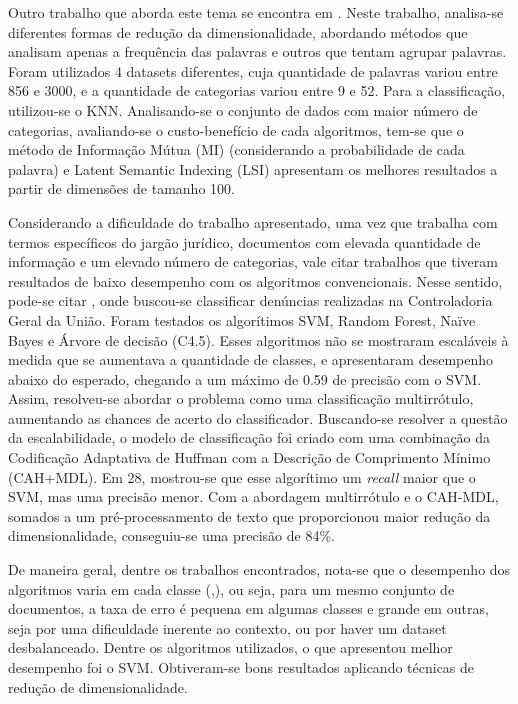 Outro trabalho que aborda este tema se encontra em \cite{ciarelli_agglomeration_2009}. Neste trabalho, analisa-se diferentes formas de redução da dimensionalidade, abordando métodos que analisam apenas a frequência das palavras e outros que tentam agrupar palavras. Foram utilizados 4 datasets diferentes, cuja quantidade de palavras variou entre 856 e 3000, e a quantidade de categorias variou entre 9 e 52. Para a classificação, utilizou-se o KNN. Analisando-se o conjunto de dados com maior número de categorias, avaliando-se o custo-benefício de cada algoritmos, tem-se que o método de Informação Mútua (MI) (considerando a probabilidade de cada palavra) e Latent Semantic Indexing (LSI) apresentam os melhores resultados a partir de dimensões de tamanho 100.

Considerando a dificuldade do trabalho apresentado, uma vez que trabalha com termos específicos do jargão jurídico, documentos com elevada quantidade de informação e um elevado número de categorias, vale citar trabalhos que tiveram resultados de baixo desempenho com os algoritmos convencionais. Nesse sentido, pode-se citar \cite{ladeirahuffman}, onde buscou-se classificar denúncias realizadas na Controladoria Geral da União. Foram testados os algorítimos SVM, Random Forest, Naïve Bayes e Árvore de decisão (C4.5). Esses algoritmos não se mostraram escaláveis à medida que se aumentava a quantidade de classes, e apresentaram desempenho abaixo do esperado, chegando a um máximo de 0.59 de precisão com o SVM. Assim, resolveu-se abordar o problema como uma classificação multirrótulo, aumentando as chances de acerto do classificador. Buscando-se resolver a questão da escalabilidade, o modelo de classificação foi criado com uma combinação da Codificação Adaptativa de Huffman com a Descrição de Comprimento Mínimo (CAH+MDL). Em 28, mostrou-se que esse algorítimo um \textit{recall} maior que o SVM, mas uma precisão menor. Com a abordagem multirrótulo e o CAH-MDL, somados a um pré-processamento de texto que proporcionou maior redução da dimensionalidade, conseguiu-se uma precisão de 84\%.


De maneira geral, dentre os trabalhos encontrados, nota-se que o desempenho dos algoritmos varia em cada classe (\cite{de_maat_machine_2010},\cite{goncalves_is_2005}), ou seja, para um mesmo conjunto de documentos, a taxa de erro é pequena em algumas classes e grande em outras, seja por uma dificuldade inerente ao contexto, ou por haver um dataset desbalanceado. Dentre os algoritmos utilizados, o que apresentou melhor desempenho foi o SVM. Obtiveram-se bons resultados aplicando técnicas de redução de dimensionalidade.
